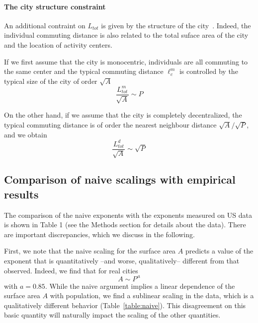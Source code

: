 \paragraph{The city structure constraint} An additional contraint on $L_{tot}$ is given by the structure of the city~\cite{Samaniego:2008}. Indeed, the individual commuting distance is also related to the total suface area of the city and the location of activity centers.

If we first assume that the city is monocentric, individuals are all commuting to the same center and the typical commuting distance $\ell^m_c$ is controlled by the typical size of the city of order $\sqrt{A}$ 
%
\begin{equation}
\frac{L_{tot}^{m}}{\sqrt{A}} \sim P
\end{equation}

On the other hand, if we assume that the city is completely decentralized, the typical commuting distance is of order the nearest neighbour distance $\sqrt{A}/\sqrt{P}$, and we obtain
%
\begin{equation}
\frac{L_{tot}^{d}}{\sqrt{A}} \sim \sqrt{P}
\end{equation}


\subsection{Comparison of naive scalings with empirical results}

The comparison of the naive exponents with the exponents measured on US data is shown in Table 1 (see the Methods section for details about the data). There are important discrepancies, which we discuss in the following.

First, we note that the naive scaling for the surface area $A$ predicts a value of the exponent that is quantitatively --and worse, qualitatively-- different from that observed. Indeed, we find that for real cities
%
\begin{equation}
A \sim P^{\,a}
\end{equation}
%
with $a=0.85$. While the naive argument implies a linear dependence of the surface area $A$ with population, we find a sublinear scaling in the data, which is a qualitatively different behavior (Table~\ref{table:naive}). This disagreement on this basic quantity will naturally impact the scaling of the other quantities.


